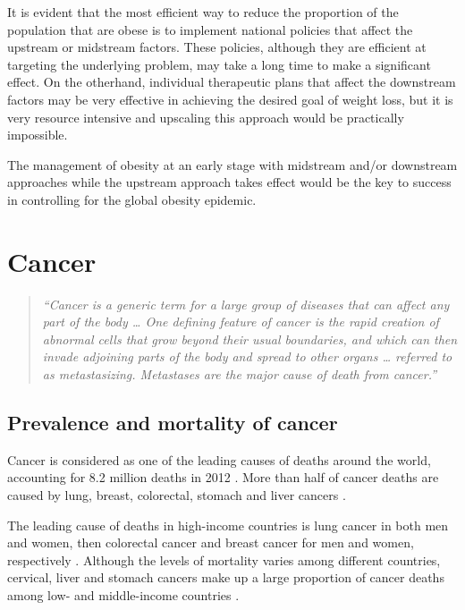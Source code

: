 \noindent
It is evident that the most efficient way to reduce the proportion of the population that are obese is to implement national policies that affect the upstream or midstream factors.
These policies, although they are efficient at targeting the underlying problem, may take a long time to make a significant effect.
On the otherhand, individual therapeutic plans that affect the downstream factors may be very effective in achieving the desired goal of weight loss, but it is very resource intensive and upscaling this approach would be practically impossible.

The management of obesity at an early stage with midstream and/or downstream approaches while the upstream approach takes effect would be the key to success in controlling for the global obesity epidemic.

\section{Cancer}
\label{sec:cancer}

\begin{quote}
	\textit{
	``Cancer is a generic term for a large group of diseases that can affect any part of the body \ldots{}
	One defining feature of cancer is the rapid creation of abnormal cells that grow beyond their usual boundaries, and which can then invade adjoining parts of the body and spread to other organs \ldots{}
	referred to as metastasizing.
	Metastases are the major cause of death from cancer.''
	\citep{WHO2016}
	}
\end{quote}

\subsection{Prevalence and mortality of cancer}
\label{sub:prevalence_and_mortality_of_cancer}

Cancer is considered as one of the leading causes of deaths around the world, accounting for 8.2 million deaths in 2012 \citep{WHO2014}.
More than half of cancer deaths are caused by lung, breast, colorectal, stomach and liver cancers \citep{WHO2014}.

The leading cause of deaths in high-income countries is lung cancer in both men and women, then colorectal cancer and breast cancer for men and women, respectively \citep{WHO2014}.
Although the levels of mortality varies among different countries, cervical, liver and stomach cancers make up a large proportion of cancer deaths among low- and middle-income countries \citep{WHO2014}.\\

